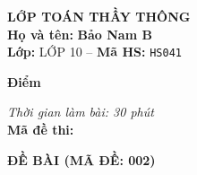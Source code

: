 \noindent
\begin{tcolorbox}[colback=white,colframe=black,arc=0mm,boxrule=0.8pt,top=4pt,bottom=4pt,left=6pt,right=6pt]
	\begin{minipage}[c]{0.44\textwidth}
		{\bfseries\large LỚP TOÁN THẦY THÔNG}\\[3pt]
		\textbf{Họ và tên:} \textbf{\large Bảo Nam B}\\[3pt]
		\textbf{Lớp:} LỚP 10 \quad -- \quad \textbf{Mã HS:} \texttt{HS041}
	\end{minipage}
	\hfill
	\begin{minipage}[c]{0.22\textwidth}
		\begin{tcolorbox}[colback=white,colframe=black,arc=0mm,boxrule=0.6pt,height=1.8cm,halign=center,valign=top,top=2pt]
			{\bfseries\normalsize Điểm}
		\end{tcolorbox}
	\end{minipage}
	\hfill
	\begin{minipage}[c]{0.30\textwidth}
		\raggedleft
		\textit{Thời gian làm bài: 30 phút}\\[4pt]
		\textbf{Mã đề thi:} 
	\end{minipage}
\end{tcolorbox}
\vspace{0.25cm}

\noindent\textbf{\large ĐỀ BÀI (MÃ ĐỀ: 002)}
\vspace{0.1cm}

